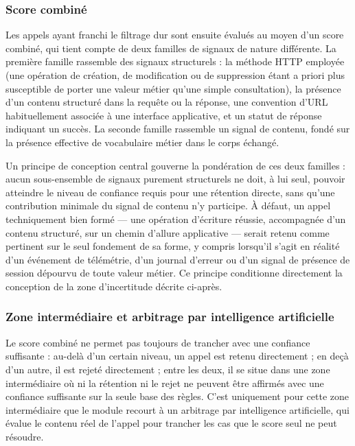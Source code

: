 \subsubsection{Score combiné}

Les appels ayant franchi le filtrage dur sont ensuite évalués au moyen d'un score combiné, qui tient compte de deux familles de signaux de nature différente. La première famille rassemble des signaux structurels : la méthode HTTP employée (une opération de création, de modification ou de suppression étant a priori plus susceptible de porter une valeur métier qu'une simple consultation), la présence d'un contenu structuré dans la requête ou la réponse, une convention d'URL habituellement associée à une interface applicative, et un statut de réponse indiquant un succès. La seconde famille rassemble un signal de contenu, fondé sur la présence effective de vocabulaire métier dans le corps échangé.

Un principe de conception central gouverne la pondération de ces deux familles : aucun sous-ensemble de signaux purement structurels ne doit, à lui seul, pouvoir atteindre le niveau de confiance requis pour une rétention directe, sans qu'une contribution minimale du signal de contenu n'y participe. À défaut, un appel techniquement bien formé — une opération d'écriture réussie, accompagnée d'un contenu structuré, sur un chemin d'allure applicative — serait retenu comme pertinent sur le seul fondement de sa forme, y compris lorsqu'il s'agit en réalité d'un événement de télémétrie, d'un journal d'erreur ou d'un signal de présence de session dépourvu de toute valeur métier. Ce principe conditionne directement la conception de la zone d'incertitude décrite ci-après.

\subsubsection{Zone intermédiaire et arbitrage par intelligence artificielle}

Le score combiné ne permet pas toujours de trancher avec une confiance suffisante : au-delà d'un certain niveau, un appel est retenu directement ; en deçà d'un autre, il est rejeté directement ; entre les deux, il se situe dans une zone intermédiaire où ni la rétention ni le rejet ne peuvent être affirmés avec une confiance suffisante sur la seule base des règles. C'est uniquement pour cette zone intermédiaire que le module recourt à un arbitrage par intelligence artificielle, qui évalue le contenu réel de l'appel pour trancher les cas que le score seul ne peut résoudre.

